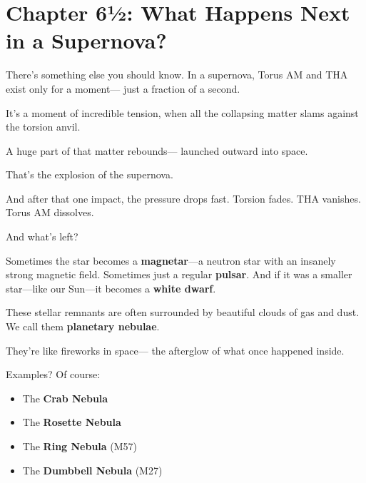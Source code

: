 \documentclass{article}
\begin{document}


\section*{Chapter 6½: What Happens Next in a Supernova?}

\noindent
There’s something else you should know.  
In a supernova, Torus AM and THA exist only for a moment—  
just a fraction of a second.

\vspace{1ex}
\noindent
It’s a moment of incredible tension,  
when all the collapsing matter slams against the torsion anvil.

\vspace{1ex}
\noindent
A huge part of that matter rebounds—  
launched outward into space.

\vspace{1ex}
\noindent
That’s the explosion of the supernova.

\vspace{1ex}
\noindent
And after that one impact, the pressure drops fast.  
Torsion fades.  
THA vanishes.  
Torus AM dissolves.

\vspace{1ex}
\noindent
And what’s left?

\vspace{1ex}
\noindent
Sometimes the star becomes a \textbf{magnetar}—a neutron star with an insanely strong magnetic field.  
Sometimes just a regular \textbf{pulsar}.  
And if it was a smaller star—like our Sun—it becomes a \textbf{white dwarf}.

\vspace{1ex}
\noindent
These stellar remnants are often surrounded by beautiful clouds of gas and dust.  
We call them \textbf{planetary nebulae}.

\vspace{1ex}
\noindent
They’re like fireworks in space—  
the afterglow of what once happened inside.

\vspace{1ex}
\noindent
Examples? Of course:

\begin{itemize}
\item The \textbf{Crab Nebula}  
\item The \textbf{Rosette Nebula}  
\item The \textbf{Ring Nebula} (M57)  
\item The \textbf{Dumbbell Nebula} (M27)
\end{itemize}
\end{document}
